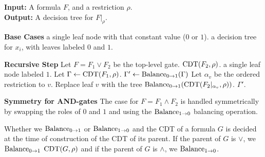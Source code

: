 \begin{algorithm}[H]
    \caption{$\CDT(F, \rho)$: Canonical Decision Tree for \demorgan Formulae}
    \label{alg:cdt-demorgan}
    \textbf{Input:} A \demorgan formula $F$, and a restriction $\rho$. \\
    \textbf{Output:} A decision tree for $F|_{\rho}$.
    \begin{algorithmic}[1]
        \Statex \textbf{Base Cases}
                \State \Return a single leaf node with that constant value ($0$ or $1$).
            \EndIf
                \State \Return a decision tree for $x_i$, with leaves labeled $0$ and $1$.
            \EndIf
            
        \Statex \textbf{Recursive Step}
            \State Let $F = F_1 \lor F_2$ be the top-level gate.
                \State \Return $\operatorname{CDT}(F_2, \rho)$.
                \State \Return a single leaf node labeled $1$.
            \Else \quad {}
                \State Let $\Gamma \gets \operatorname{CDT}(F_1, \rho)$. 
                \State $\Gamma' \gets \operatorname{Balance_{0 \to 1}}(\Gamma)$ 
                    \State Let $\alpha_v$ be the ordered restriction to $v$.
                    \State Replace leaf $v$ with the tree $\operatorname{Balance_{0 \to 1}}(\operatorname{CDT}(F_2|_{\alpha_v}, \rho))$.  
                \EndFor
                \State \Return $\Gamma'$.
            \EndIf
            
        \Statex \textbf{Symmetry for AND-gates}
        \State The case for $F = F_1 \land F_2$ is handled symmetrically by swapping the roles of $0$ and $1$ and using the $\operatorname{Balance_{1 \to 0}}$ balancing operation.
    \end{algorithmic}
\end{algorithm}
Whether we $\operatorname{Balance_{0 \to 1}}$ or $\operatorname{Balance_{1 \to 0}}$ and the CDT of a formula $G$ is decided at the time of construction of the CDT of its parent. If the parent of $G$ is $\lor$, we $\operatorname{Balance_{0 \to 1}}$ $\operatorname{CDT}(G,\rho)$ and if the parent of $G$ is $\land$, we $\operatorname{Balance_{1 \to 0}}$.  


